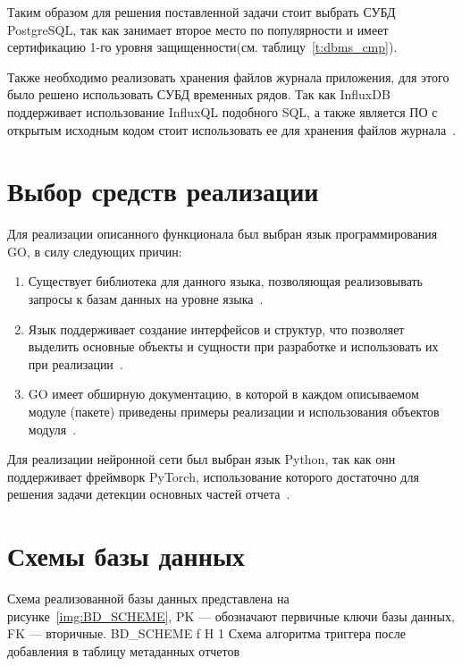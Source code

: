 Таким образом для решения поставленной задачи стоит выбрать СУБД PostgreSQL, так как занимает второе место по популярности  и имеет сертификацию 1-го уровня защищенности(см. таблицу~\ref{t:dbms_cmp}).

Также необходимо реализовать хранения файлов журнала приложения, для этого было решено использовать СУБД временных рядов. Так как InfluxDB поддерживает использование InfluxQL подобного SQL, а также является ПО с открытым исходным кодом стоит использовать ее для хранения файлов журнала~\cite{time_db}.

\section{Выбор средств реализации}
Для реализации описанного функционала был выбран язык программирования GO, в силу следующих причин:
\begin{enumerate}
	\item Существует библиотека для данного языка, позволяющая реализовывать запросы к базам данных на уровне языка~\cite{gorm}.
	\item Язык поддерживает создание интерфейсов и структур, что позволяет выделить основные объекты и сущности при разработке и использовать их при реализации~\cite{go_interface}.
	\item GO имеет обширную документацию, в которой в каждом описываемом модуле (пакете) приведены примеры реализации и использования объектов модуля~\cite{go_package}.
\end{enumerate}

Для реализации нейронной сети был выбран язык Python, так как онн поддерживает фреймворк PyTorch, использование которого достаточно для решения задачи детекции основных частей отчета~\cite{pytorch}.

\section{Схемы базы данных}
Схема реализованной базы данных представлена на рисунке~\ref{img:BD_SCHEME}, PK --- обозначают первичные ключи базы данных, FK --- вторичные.
{BD_SCHEME} %
{f} %
{H} %
{1\textwidth} %
{Схема алгоритма триггера после добавления в таблицу метаданных отчетов} %

